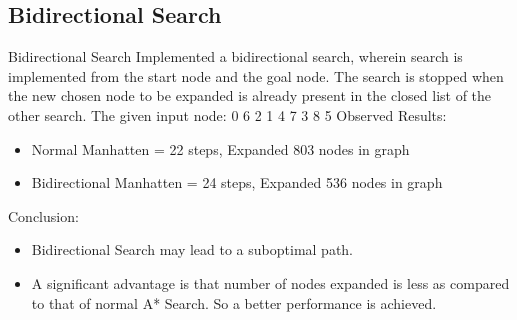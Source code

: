 \documentclass{beamer}
\begin{document}
\subsection{Bidirectional Search}
\begin{frame}{Bidirectional Search}
Implemented a bidirectional search, wherein search is implemented from the start node and the goal node. The search is stopped when the new chosen node to be expanded is already present in the closed list of the other search. 
\newline
The given input node: 0 6 2 1 4 7 3 8 5 
\newline
Observed Results:
\begin{itemize}
\item Normal Manhatten = 22 steps, Expanded 803 nodes in graph
\item Bidirectional Manhatten = 24 steps, Expanded 536 nodes in graph
\end{itemize}
Conclusion:
\begin{itemize}
\item Bidirectional Search may lead to a suboptimal path.
\item A significant advantage is that number of nodes expanded is less as compared to that of normal A* Search. So a better performance is achieved.
\end{itemize}

\end{frame}
\end{document}
